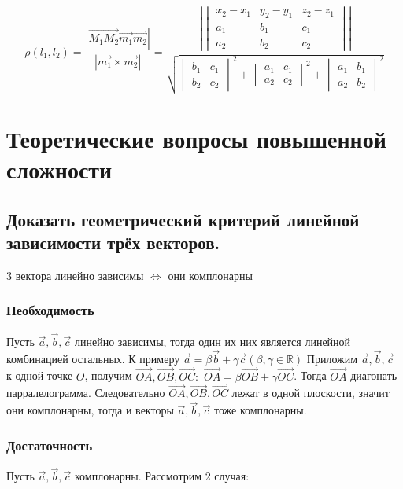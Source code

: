 \documentclass[a4paper, 10pt]{article}
\newcommand{\bvec}[1]{\overrightarrow{#1}}
\renewcommand{\a}{\vec{a}}
\renewcommand{\b}{\vec{b}}
\renewcommand{\c}{\vec{c}}
\newcommand{\image}[2]{
	\begin{figure}[H]
		\center{\texttt{[image: img/\#1]} }
    \end{figure}
}
\begin{document}
$$\rho(l_1, l_2) = \frac{ |\bvec{M_1M_2}\vec{m_1}\vec{m_2}| }{ |\vec{m_1}\times\vec{m_2}| }=
\frac{ |\begin{vmatrix}x_2-x_1&y_2-y_1&z_2-z_1\\a_1&b_1&c_1\\a_2&b_2&c_2\end{vmatrix}| }
    {\sqrt{\begin{vmatrix}b_1&c_1\\b_2&c_2\end{vmatrix}^2+
    \begin{vmatrix}a_1&c_1\\a_2&c_2\end{vmatrix}^2+
    \begin{vmatrix}a_1&b_1\\a_2&b_2\end{vmatrix}^2}}$$

\section{Теоретические вопросы повышенной сложности}

\subsection{Доказать геометрический критерий линейной зависимости трёх векторов.}

3 вектора линейно зависимы $\iff$ они комплонарны

\subsubsection{Необходимость}

Пусть $\a, \b, \c$ линейно зависимы, тогда один их них является линейной комбинацией
остальных. К примеру $\a = \beta\b + \gamma\c (\beta,\gamma \in \mathbb{R})$
Приложим $\a, \b, \c$ к одной точке $O$, получим $\bvec{OA}, \bvec{OB}, \bvec{OC}:$
$\bvec{OA} = \beta\bvec{OB} + \gamma\bvec{OC}$. Тогда $\bvec{OA}$ диагонать парралелограмма.
Следовательно $\bvec{OA}, \bvec{OB}, \bvec{OC}$ лежат в одной плоскости, значит они комплонарны,
тогда и векторы $\a, \b, \c$ тоже комплонарны.
\image{3.png}{200}

\subsubsection{Достаточность}

Пусть $\a, \b, \c$ комплонарны. Рассмотрим 2 случая:
\end{document}
